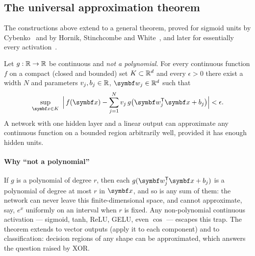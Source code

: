 \documentclass[11pt]{article}
\newcommand{\w}{\vect{w}}
\begin{document}
\subsection{The universal approximation theorem}\label{sec:uat}

The constructions above extend to a general theorem, proved for sigmoid units by Cybenko~\cite{cybenko1989} and by
Hornik, Stinchcombe and White~\cite{hornik1989}, and later for essentially every activation~\cite{hornik1991,leshno1993}.

\begin{keyidea}
Let $g : \mathbb{R} \to \mathbb{R}$ be continuous and \emph{not a polynomial}. For every continuous function $f$ on a compact (closed and bounded) set $K
\subset \mathbb{R}^d$ and every $\epsilon > 0$ there exist a width $N$ and parameters $v_j, b_j \in \mathbb{R}$, $\w_j \in \R^d$ such that
\[
  \sup_{\x \in K}\ \Big|\, f(\x) - \sum_{j=1}^N v_j\,g\big(\w_j\T\x + b_j\big) \Big| < \epsilon .
\]
A network with one hidden layer and a linear output can approximate any continuous function on a bounded region
arbitrarily well, provided it has enough hidden units.
\end{keyidea}

\paragraph{Why ``not a polynomial''} If $g$ is a polynomial of degree $r$, then each $g(\w_j\T\x + b_j)$ is a polynomial
of degree at most $r$ in $\x$, and so is any sum of them: the network can never leave this finite-dimensional space,
and cannot approximate, say, $e^{x}$ uniformly on an interval when $r$ is fixed. Any non-polynomial continuous
activation --- sigmoid, tanh, ReLU, GELU, even $\cos$ --- escapes this trap. The theorem extends to vector outputs
(apply it to each component) and to classification: decision regions of any shape can be approximated, which answers
the question raised by XOR.
\end{document}
